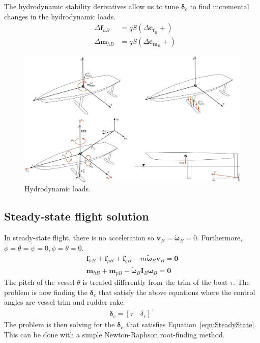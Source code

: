 \documentclass[10pt]{article}
\newcommand{\mbf}[1]{\mathbf{#1}}
\newcommand{\be}{\begin{eqnarray}}
\newcommand{\ee}{\end{eqnarray}}
\begin{document}
The hydrodynamic stability derivatives allow us to tune $\boldsymbol{\delta}_c$ to find incremental changes in the hydrodynamic loads.
\be
& \Delta \mbf{f}_{h B} & = q S \left( \Delta \mbf{c}_{\mbf{f}_B} + \right)
\\
& \Delta \mbf{m}_{h B} & = q S \left( \Delta \mbf{c}_{\mbf{m}_B} + \right)
\ee
% 
\begin{figure}[htb!]
	\centering
	\includegraphics[width=\linewidth,clip,trim={0cm 22cm 0cm 0cm}]{SeakeepingDiagram.pdf}
	\caption{\label{fig:HydroLoads}
		Hydrodynamic loads.
	}
\end{figure}

\subsection{Steady-state flight solution}
% 
In steady-state flight, there is no acceleration so $\dot{\mbf{v}}_B=\dot{\boldsymbol{\omega}}_B=0$.
Furthermore, $\dot{\phi}=\dot{\theta}=\dot{\psi} = 0, \phi=\theta=0$.
\be
\label{eqn:SteadyState}
\boxed{
	\mbf{f}_{h B} + \mbf{f}_{p B} + \mbf{f}_{g B} - m \tilde{\boldsymbol{\omega}}_B \mbf{v}_B= \mbf{0}
}
\\
\boxed{\mbf{m}_{h B} + \mbf{m}_{p B} - \tilde{\boldsymbol{\omega}}_B \mbf{I}_B \boldsymbol{\omega}_B = \mbf{0}
}
\ee
The pitch of the vessel $\theta$ is treated differently from the trim of the boat $\tau$.
The problem is now finding the $\boldsymbol{\delta}_c$ that satisfy the above equations where the control angles are vessel trim and rudder rake.
\be
\boldsymbol{\delta}_c = \left[
	\tau \quad \delta_r
	\right]^{\top}
\ee
The problem is then solving for the $\boldsymbol{\delta_c}$ that satisfies Equation~\eqref{eqn:SteadyState}.
This can be done with a simple Newton-Raphson root-finding method.
\end{document}
